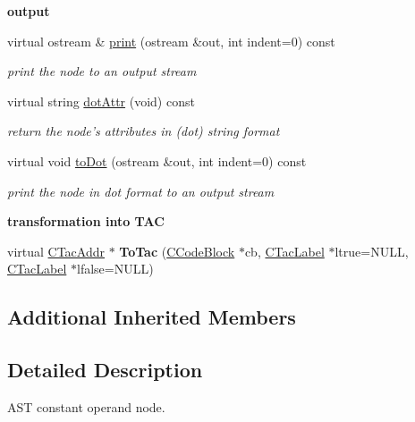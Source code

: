 \begin{Indent}{\bf output}\par
\begin{DoxyCompactItemize}
\item 
virtual ostream \& \hyperlink{classCAstDesignator_ae5ab1b4b8bcd57b837176e305b990473}{print} (ostream \&out, int indent=0) const 
\begin{DoxyCompactList}\small\item\em print the node to an output stream \end{DoxyCompactList}\item 
virtual string \hyperlink{classCAstDesignator_a04c601adba494a707aff43da041212fa}{dot\-Attr} (void) const 
\begin{DoxyCompactList}\small\item\em return the node's attributes in (dot) string format \end{DoxyCompactList}\item 
virtual void \hyperlink{classCAstDesignator_a0f0229b0e09646653d7058bd1c118552}{to\-Dot} (ostream \&out, int indent=0) const 
\begin{DoxyCompactList}\small\item\em print the node in dot format to an output stream \end{DoxyCompactList}\end{DoxyCompactItemize}
\end{Indent}
\begin{Indent}{\bf transformation into T\-A\-C}\par
\begin{DoxyCompactItemize}
\item 
\hypertarget{classCAstDesignator_ae2acbc68ac2afcfa2f816cd434401be8}{virtual \hyperlink{classCTacAddr}{C\-Tac\-Addr} $\ast$ {\bfseries To\-Tac} (\hyperlink{classCCodeBlock}{C\-Code\-Block} $\ast$cb, \hyperlink{classCTacLabel}{C\-Tac\-Label} $\ast$ltrue=N\-U\-L\-L, \hyperlink{classCTacLabel}{C\-Tac\-Label} $\ast$lfalse=N\-U\-L\-L)}\label{classCAstDesignator_ae2acbc68ac2afcfa2f816cd434401be8}

\end{DoxyCompactItemize}
\end{Indent}
\subsection*{Additional Inherited Members}


\subsection{Detailed Description}
A\-S\-T constant operand node. 

